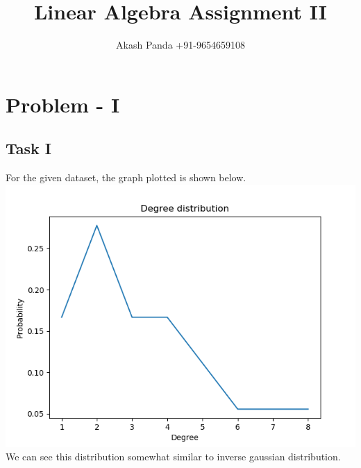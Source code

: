 \documentclass[runningheads]{llncs}
\begin{document}
%
\title{Linear Algebra Assignment II}
%
%
\author{Akash Panda {+91-9654659108}}
%
%
%
\maketitle              %
%
%
%
%
\section{Problem - I}
\subsection{Task I}
For the given dataset, the graph plotted is shown below.\\
\includegraphics[scale=0.5]{problem_1_task_1} \\
We can see this distribution somewhat similar to inverse gaussian distribution.
\end{document}

